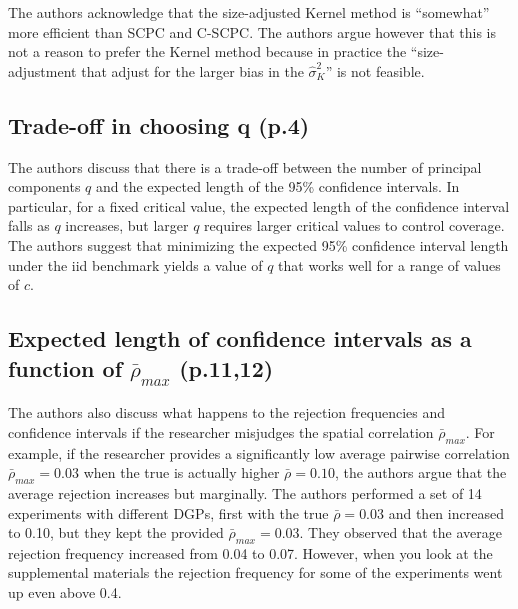 \documentclass[
]{article}
\begin{document}
The authors acknowledge that the size-adjusted Kernel method is
``somewhat'' more efficient than SCPC and C-SCPC. The authors argue
however that this is not a reason to prefer the Kernel method because in
practice the ``size-adjustment that adjust for the larger bias in the
\(\hat\sigma_{K}^2\)'' is not feasible.

\hypertarget{trade-off-in-choosing-q-p.4}{%
\subsection{Trade-off in choosing q
(p.4)}\label{trade-off-in-choosing-q-p.4}}

The authors discuss that there is a trade-off between the number of
principal components \(q\) and the expected length of the 95\%
confidence intervals. In particular, for a fixed critical value, the
expected length of the confidence interval falls as \(q\) increases, but
larger \(q\) requires larger critical values to control coverage. The
authors suggest that minimizing the expected 95\% confidence interval
length under the iid benchmark yields a value of \(q\) that works well
for a range of values of \(c\).

\hypertarget{expected-length-of-confidence-intervals-as-a-function-of-barrho_max-p.1112}{%
\subsection{\texorpdfstring{Expected length of confidence intervals as a
function of \(\bar\rho_{max}\)
(p.11,12)}{Expected length of confidence intervals as a function of \textbackslash bar\textbackslash rho\_\{max\} (p.11,12)}}\label{expected-length-of-confidence-intervals-as-a-function-of-barrho_max-p.1112}}

The authors also discuss what happens to the rejection frequencies and
confidence intervals if the researcher misjudges the spatial correlation
\(\bar\rho_{max}\). For example, if the researcher provides a
significantly low average pairwise correlation \(\bar\rho_{max}=0.03\)
when the true is actually higher \(\bar\rho=0.10\), the authors argue
that the average rejection increases but marginally. The authors
performed a set of 14 experiments with different DGPs, first with the
true \(\bar\rho=0.03\) and then increased to 0.10, but they kept the
provided \(\bar\rho_{max}=0.03\). They observed that the average
rejection frequency increased from 0.04 to 0.07. However, when you look
at the supplemental materials the rejection frequency for some of the
experiments went up even above 0.4.
\end{document}
